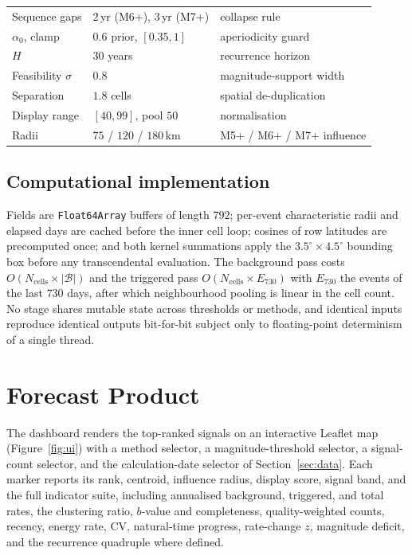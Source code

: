 \documentclass[11pt,a4paper]{article}
\begin{document}
\begin{table}[h]
\begin{tabular}{lll}
Sequence gaps & $2$\,yr (M6+), $3$\,yr (M7+) & collapse rule\\
$\alpha_0$, clamp & $0.6$ prior, $[0.35,1]$ & aperiodicity guard\\
$H$ & $30$ years & recurrence horizon\\
Feasibility $\sigma$ & $0.8$ & magnitude-support width\\
Separation & $1.8$ cells & spatial de-duplication\\
Display range & $[40,99]$, pool $50$ & normalisation\\
Radii & $75$ / $120$ / $180$\,km & M5+ / M6+ / M7+ influence\\
\bottomrule
\end{tabular}
\end{table}

\subsection{Computational implementation}
Fields are \texttt{Float64Array} buffers of length $792$; per-event
characteristic radii and elapsed days are cached before the inner cell loop;
cosines of row latitudes are precomputed once; and both kernel summations
apply the $3.5^\circ\times4.5^\circ$ bounding box before any transcendental
evaluation. The background pass costs $O(N_{\text{cells}}\times
\lvert\mathcal{B}\rvert)$ and the triggered pass
$O(N_{\text{cells}}\times E_{730})$ with $E_{730}$ the events of the last
$730$ days, after which neighbourhood pooling is linear in the cell count.
No stage shares mutable state across thresholds or methods, and identical
inputs reproduce identical outputs bit-for-bit subject only to floating-point
determinism of a single thread.

\section{Forecast Product}\label{sec:product}
The dashboard renders the top-ranked signals on an interactive Leaflet map
(Figure~\ref{fig:ui}) with a method selector, a magnitude-threshold selector,
a signal-count selector, and the calculation-date selector of
Section~\ref{sec:data}. Each marker reports its rank, centroid, influence
radius, display score, signal band, and the full indicator suite, including
annualised background, triggered, and total rates, the clustering ratio,
$b$-value and completeness, quality-weighted counts, recency, energy rate,
CV, natural-time progress, rate-change $z$, magnitude deficit, and the
recurrence quadruple where defined.
\end{document}
